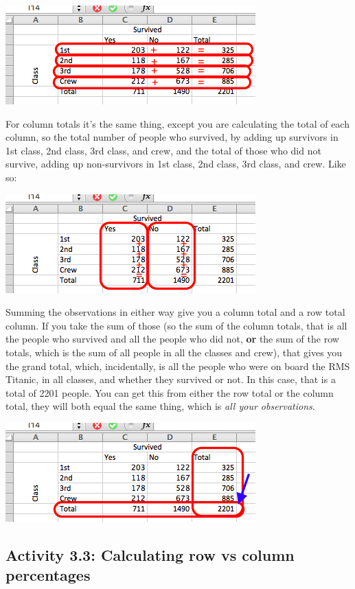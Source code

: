 \documentclass[
]{book}
\begin{document}
\includegraphics{imgs/titanic_row_total_calc.png}

For column totals it's the same thing, except you are calculating the total of each column, so the total number of people who survived, by adding up survivors in 1st class, 2nd class, 3rd class, and crew, and the total of those who did not survive, adding up non-survivors in 1st class, 2nd class, 3rd class, and crew. Like so:

\includegraphics{imgs/titanic_col_total_calc.png}

Summing the observations in either way give you a column total and a row total column. If you take the sum of those (so the sum of the column totals, that is all the people who survived and all the people who did not, \textbf{or} the sum of the row totals, which is the sum of all people in all the classes and crew), that gives you the grand total, which, incidentally, is all the people who were on board the RMS Titanic, in all classes, and whether they survived or not. In this case, that is a total of 2201 people. You can get this from either the row total or the column total, they will both equal the same thing, which is \emph{all your observations}.

\includegraphics{imgs/titanic_w_total_cols.png}

\hypertarget{activity-3.3-calculating-row-vs-column-percentages}{%
\subsection{Activity 3.3: Calculating row vs column percentages}\label{activity-3.3-calculating-row-vs-column-percentages}}
\end{document}
